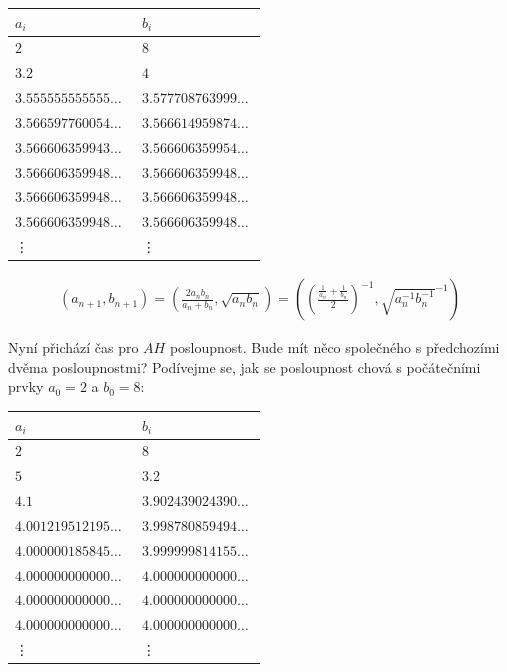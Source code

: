 \documentclass[12pt]{report}
\begin{document}
\begin{longtable}[H]{>{\raggedright\arraybackslash}p{0.3\linewidth}p{0.202\linewidth}}
\toprule
$a_i$ & $b_i$\\
\midrule
$2$ & \noindent $8$\\
$3.2$ & \noindent $4$\\
$3.555555555555\dots$ & $3.577708763999\dots$\\
$3.566597760054\dots$ & $3.566614959874\dots$\\
$3.566606359943\dots$ & $3.566606359954\dots$\\ 
$3.566606359948\dots$ & $3.566606359948\dots$\\
$3.566606359948\dots$ & $3.566606359948\dots$\\
$3.566606359948\dots$ & $3.566606359948\dots$\\
\vdots & \vdots\\
\bottomrule 
\end{longtable} 


\begin{align*}
\left(a_{n+1}, b_{n+1} \right) = \left( \frac{2 a_n b_n}{a_n + b_n}, \sqrt{a_n b_n} \right) = \left( \left(\frac{\frac{1}{a_n}+ \frac{1}{b_n}}{2} \right)^{-1}, \sqrt{a_n ^{-1} b_n ^{-1}} ^{-1}  \right)
\end{align*}

Nyní přichází čas pro $AH$ posloupnost. Bude mít něco společného s předchozími dvěma posloupnostmi? Podívejme se, jak se posloupnost chová s počátečními prvky $a_0 = 2$ a $b_0 = 8$:

\begin{longtable}[H]{>{\raggedright\arraybackslash}p{0.3\linewidth}p{0.202\linewidth}}
\toprule
$a_i$ & $b_i$\\
\midrule
$2$ & \noindent $8$\\
$5$ & \noindent $3.2$\\
$4.1$ & $3.902439024390\dots$\\
$4.001219512195\dots$ & $3.998780859494\dots$\\ 
$4.000000185845\dots$ & $3.999999814155\dots$\\
$4.000000000000\dots$ & $4.000000000000\dots$\\
$4.000000000000\dots$ & $4.000000000000\dots$\\
$4.000000000000\dots$ & $4.000000000000\dots$\\
\vdots & \vdots\\
\bottomrule 
\end{longtable} 
\end{document}
